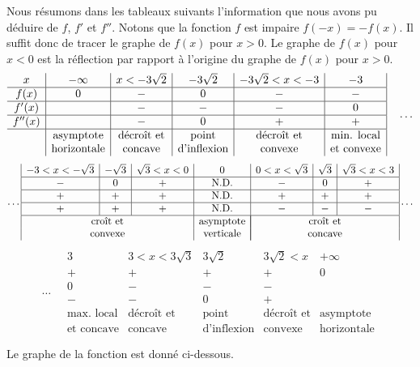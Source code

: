 {Nous résumons dans les tableaux suivants l'information que nous avons pu
déduire de $f$, $f'$ et $f''$.  Notons que la fonction $f$ est impaire
$f(-x)=-f(x)$.  Il suffit donc de tracer le graphe de $f(x)$ pour
$x>0$.  Le graphe de $f(x)$ pour $x<0$ est la réflection par rapport à
l'origine du graphe de $f(x)$ pour $x > 0$.
\[
\begin{array}{c|c|c|c|c|c|}
x & -\infty & x< -3\sqrt{2} & -3\sqrt{2} & -3\sqrt{2} <x< -3 & -3 \\
\hline
f(x) & 0 & - & 0 & - & - \\
\hline
f'(x) & & - & - & - & 0  \\
\hline
f''(x) & & - & 0 & + & + \\
\hline
& \text{asymptote} & \text{décroît et} & \text{point} & \text{décroît et} &
\text{min. local}  \\
& \text{horizontale} & \text{concave} & \text{d'inflexion} & \text{convexe} &
\text{et convexe}
\end{array} \quad \ldots
\]
\[
\ldots \begin{array}{|c|c|c|c|c|c|c|}
-3 <x< -\sqrt{3} & -\sqrt{3} & \sqrt{3} <x< 0 & 0 & 0 <x< \sqrt{3}
& \sqrt{3} & \sqrt{3} <x< 3  \\
\hline
- & 0 & + & \text{N.D.} & - & 0 & + \\
\hline
+ & + & + & \text{N.D.} & + & + & + \\
\hline
+ & + & + & \text{N.D.} & - & - & - \\
\hline
\multicolumn{3}{|c|}{\text{croît et}} & \text{asymptote}
& \multicolumn{3}{|c|}{\text{croît et}} \\
\multicolumn{3}{|c|}{\text{convexe}} & \text{verticale}
& \multicolumn{3}{|c|}{\text{concave}}
\end{array} \ldots
\]
\[
\ldots \quad \begin{array}{|c|c|c|c|c}
3 & 3 <x< 3\sqrt{3} & 3\sqrt{2} & 3\sqrt{2} <x & +\infty \\
\hline
+ & + & + & + & 0 \\
\hline
0 & - & - & - & \\
\hline
- & - & 0 & + & \\
\hline
\text{max. local} & \text{décroît et} & \text{point} & \text{décroît et} &
\text{asymptote} \\
\text{et concave} & \text{concave} & \text{d'inflexion} & \text{convexe} &
\text{horizontale}
\end{array}
\]

Le graphe de la fonction est donné ci-dessous.

}
